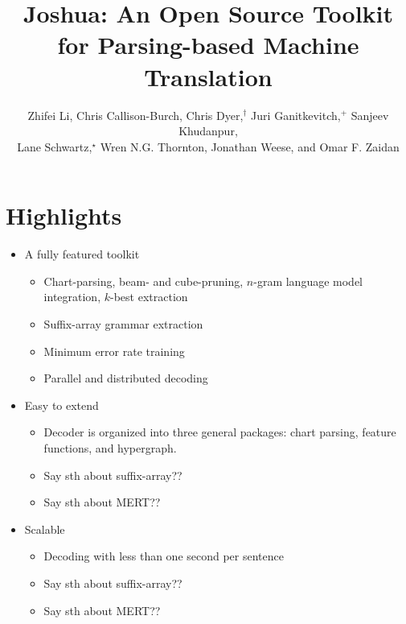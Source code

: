 \documentclass[noback]{poster}
\begin{document}
\newcommand{\don}{\ensuremath{d_{\textsc{ON}}}}
\newcommand{\doff}{\ensuremath{d_{\textsc{OFF}}}}
\newcommand{\dsoma}{\ensuremath{d_{\textsc{SOMA}}} \xspace}
\newcommand{\um}{\ensuremath{\mu \text{m}}\xspace}
\newcommand{\dmin}{d$_{\textup{min}}$\xspace}

\title{Joshua: An Open Source Toolkit for Parsing-based Machine Translation}
\author{Zhifei Li,
Chris Callison-Burch,
Chris Dyer,$^\dagger$
Juri Ganitkevitch,$^+$
Sanjeev Khudanpur,\\ 
Lane Schwartz,$^\star$
Wren N.G. Thornton,
Jonathan Weese,
{\textnormal{and}} Omar F. Zaidan}
\address{Johns Hopkins University,
$^\dagger$University of Maryland,
$^+$RWTH Aachen University,
$^\star$University of Minnesota }

\makeposter

\section{Highlights}

\begin{itemize}

\item A fully featured toolkit
\begin{itemize}
\item Chart-parsing, beam- and cube-pruning, $n$-gram language model integration, $k$-best extraction
\item Suffix-array grammar extraction
\item Minimum error rate training
\item Parallel and distributed decoding 
\end{itemize}

\item Easy to extend
\begin{itemize}
\item Decoder is organized into three general packages: chart parsing, feature functions, and hypergraph.
\item Say sth about suffix-array??
\item Say sth about MERT??
\end{itemize}

\item Scalable
\begin{itemize}
\item Decoding with less than one second per sentence
\item Say sth about suffix-array??
\item Say sth about MERT??
\end{itemize}

\end{itemize}
\end{document}
